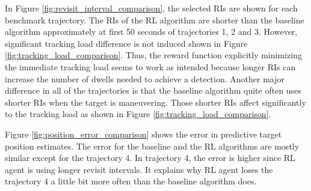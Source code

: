\documentclass[english, 12pt, a4paper, elec, utf8, a-1b, online]{aaltothesis}
\begin{document}
In Figure \ref{fig:revisit_interval_comparison}, the selected RIs are shown for each benchmark trajectory.
The RIs of the RL algorithm are shorter than the baseline algorithm approximately at first 50 seconds of trajectories 1, 2 and 3.
However, significant tracking load difference is not induced shown in Figure \ref{fig:tracking_load_comparison}.
Thus, the reward function explicitly minimizing the immediate tracking load seems to work as intended because longer RIs can increase the number of dwells needed to achieve a detection.
Another major difference in all of the trajectories is that the baseline algorithm quite often uses shorter RIs when the target is maneuvering.
Those shorter RIs affect significantly to the tracking load as shown in Figure \ref{fig:tracking_load_comparison}.

Figure \ref{fig:position_error_comparison} shows the error in predictive target position estimates.
The error for the baseline and the RL algorithms are mostly similar except for the trajectory 4.
In trajectory 4, the error is higher since RL agent is using longer revisit intervals.
It explains why RL agent loses the trajectory 4 a little bit more often than the baseline algorithm does.
\end{document}
